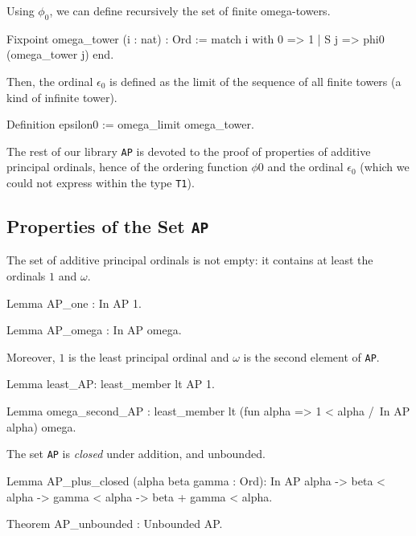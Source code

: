 {Using $\phi_0$, we can define recursively the set of finite omega-towers.


\begin{Coqsrc}
Fixpoint omega_tower (i : nat) : Ord :=
  match i with
    0 =>  1
  | S j => phi0 (omega_tower j)
  end.
\end{Coqsrc}

\label{sect:epsilon0-as-limit}
Then, the ordinal  $\epsilon_0$ is defined as the limit of the sequence of all finite towers (a kind of infinite tower).

\begin{Coqsrc}
Definition epsilon0 := omega_limit omega_tower.
\end{Coqsrc}

The rest of our library \texttt{AP} is devoted to the proof of properties of additive principal ordinals, hence of the ordering function  $\phi0$ and the ordinal $\epsilon_0$ (which we could not express within the type \texttt{T1}).

\subsection{Properties of the Set  \texttt{AP}}

The set of additive principal ordinals is not empty: it contains at least the ordinals  $1$ and  $\omega$. 

\begin{Coqsrc}
Lemma AP_one : In AP 1.

Lemma AP_omega : In AP omega.
\end{Coqsrc}

Moreover, $1$ is the least principal ordinal and $\omega$ is the second element of
\texttt{AP}.


\begin{Coqsrc}
Lemma least_AP: least_member  lt AP 1. 

Lemma omega_second_AP :
  least_member   lt 
                  (fun alpha => 1 < alpha /\ In AP alpha)
                  omega.
\end{Coqsrc}

The set  \texttt{AP} is  \emph{closed} under addition, and unbounded.

\begin{Coqsrc}
Lemma AP_plus_closed (alpha beta gamma : Ord): 
     In AP alpha -> beta < alpha -> gamma < alpha ->
     beta + gamma < alpha.

Theorem AP_unbounded : Unbounded AP.
\end{Coqsrc}

}
